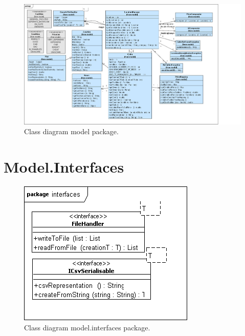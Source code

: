 \begin{landscape}
\begin{figure}
\begin{center}
\includegraphics[height=1.00\textheight]{gfx/class_model.png} 
\end{center}
\caption{Class diagram model package.}
\label{fig:model}
\end{figure}
\end{landscape}

\section{Model.Interfaces}

\begin{figure}[H]
\begin{center}
\includegraphics[scale=1]{gfx/class_interfaces.png} 
\end{center}
\caption{Class diagram model.interfaces package.}
\label{fig:model_interfaces}
\end{figure}